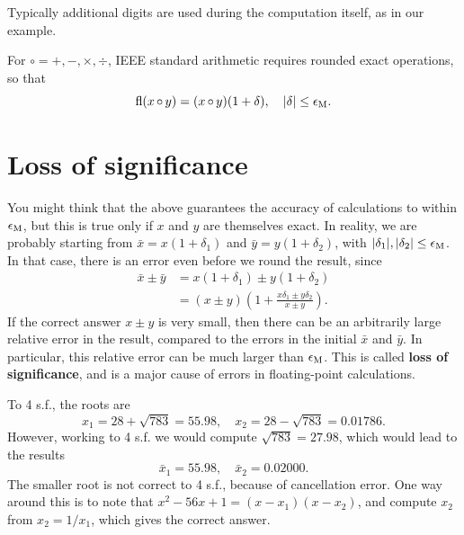 \documentclass[
  letterpaper,
  DIV=11,
  numbers=noendperiod]{scrreprt}
\begin{document}
\begin{tcolorbox}[enhanced jigsaw, bottomrule=.15mm, colbacktitle=quarto-callout-note-color!10!white, breakable, arc=.35mm, coltitle=black, colback=white, bottomtitle=1mm, opacityback=0, title=\textcolor{quarto-callout-note-color}{\faInfo}\hspace{0.5em}{Note}, titlerule=0mm, toptitle=1mm, opacitybacktitle=0.6, colframe=quarto-callout-note-color-frame, leftrule=.75mm, rightrule=.15mm, left=2mm, toprule=.15mm]

Typically additional digits are used during the computation itself, as
in our example.

\end{tcolorbox}

For \({\circ} = +,-,\times, \div\), IEEE standard arithmetic requires
rounded exact operations, so that \[
\mathrm{fl}(x {\,\circ\,} y) = (x {\,\circ\,} y)(1+\delta), \quad |\delta|\leq\epsilon_{\rm M}.
\]

\section{Loss of significance}\label{loss-of-significance}

You might think that the above guarantees the accuracy of calculations
to within \(\epsilon_{\rm M}\), but this is true only if \(x\) and \(y\)
are themselves exact. In reality, we are probably starting from
\(\bar{x}=x(1+\delta_1)\) and \(\bar{y}=y(1 + \delta_2)\), with
\(|\delta_1|, |\delta_2| \leq \epsilon_{\rm M}\). In that case, there is
an error even before we round the result, since \[
\begin{aligned}
\bar{x} \pm \bar{y} &= x(1+ \delta_1) \pm y(1 + \delta_2)\\
&= (x\pm y)\left(1 + \frac{x\delta_1 \pm y\delta_2}{x\pm y}\right).
\end{aligned}
\] If the correct answer \(x\pm y\) is very small, then there can be an
arbitrarily large relative error in the result, compared to the errors
in the initial \(\bar{x}\) and \(\bar{y}\). In particular, this relative
error can be much larger than \(\epsilon_{\rm M}\). This is called
\textbf{loss of significance}, and is a major cause of errors in
floating-point calculations.

To 4 s.f., the roots are \[
x_1 = 28 + \sqrt{783} = 55.98, \quad x_2 = 28-\sqrt{783} = 0.01786.
\] However, working to 4 s.f. we would compute \(\sqrt{783} = 27.98\),
which would lead to the results \[
\bar{x}_1 = 55.98, \quad \bar{x}_2 = 0.02000.
\] The smaller root is not correct to 4 s.f., because of cancellation
error. One way around this is to note that
\(x^2 - 56x + 1 = (x-x_1)(x-x_2)\), and compute \(x_2\) from
\(x_2 = 1/x_1\), which gives the correct answer.
\end{document}
